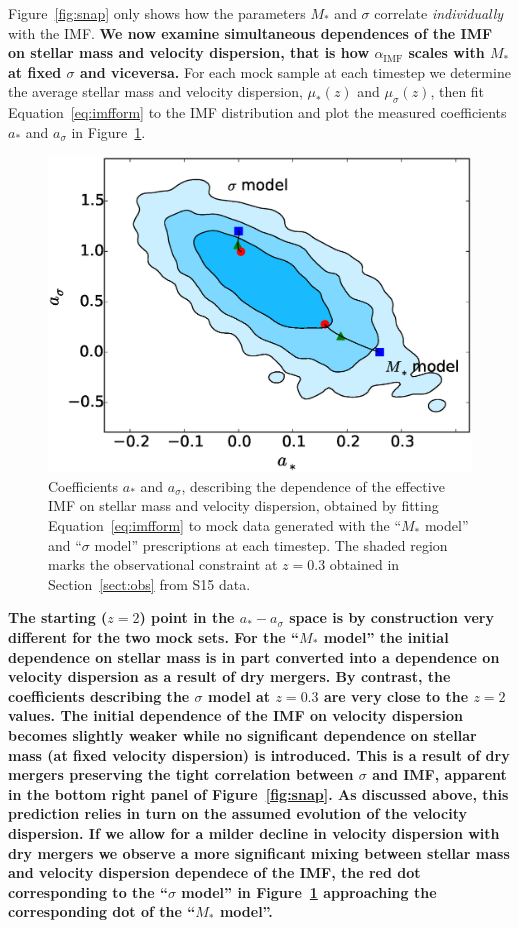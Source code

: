 \documentclass[usenatbib, letters]{mnras}
\def\aimf{\alpha_{\mathrm{IMF}}}
\def\Sref#1{Section~\ref{#1}\xspace}
\def\Fref#1{Figure~\ref{#1}\xspace}
\def\Eref#1{Equation~\ref{#1}\xspace}
\begin{document}
\Fref{fig:snap} only shows how the parameters $M_*$ and $\sigma$ correlate {\em individually} with the IMF.
{\bf We now examine simultaneous dependences of the IMF on stellar mass and velocity dispersion, that is how $\aimf$ scales with $M_*$ at fixed $\sigma$ and viceversa.}
For each mock sample at each timestep we determine the average stellar mass and velocity dispersion, $\mu_*(z)$ and $\mu_\sigma(z)$, then fit \Eref{eq:imfform} to the IMF distribution and plot the measured coefficients $a_*$ and $a_\sigma$ in \Fref{fig:tracks}.
%
\begin{figure}
 \includegraphics[width=\columnwidth]{tracks.eps}
 \caption{ 
Coefficients $a_*$ and $a_\sigma$, describing the dependence of the effective IMF on stellar mass and velocity dispersion, obtained by fitting \Eref{eq:imfform} to mock data generated with the ``$M_*$ model'' and ``$\sigma$ model'' prescriptions at each timestep.
The shaded region marks the observational constraint at $z=0.3$ obtained in \Sref{sect:obs} from S15 data.
}
 \label{fig:tracks}
\end{figure}
%
{\bf
The starting ($z=2$) point in the $a_*-a_\sigma$ space is by construction very different for the two mock sets. 
For the ``$M_*$ model'' the initial dependence on stellar mass is in part converted into a dependence on velocity dispersion as a result of dry mergers.
By contrast, the coefficients describing the $\sigma$ model at $z=0.3$ are very close to the $z=2$ values. The initial dependence of the IMF on velocity dispersion becomes slightly weaker while no significant dependence on stellar mass (at fixed velocity dispersion) is introduced. This is a result of dry mergers preserving the tight correlation between $\sigma$ and IMF, apparent in the bottom right panel of \Fref{fig:snap}.
As discussed above, this prediction relies in turn on the assumed evolution of the velocity dispersion. If we allow for a milder decline in velocity dispersion with dry mergers we observe a more significant mixing between stellar mass and velocity dispersion dependece of the IMF, the red dot corresponding to the ``$\sigma$ model'' in \Fref{fig:tracks} approaching the corresponding dot of the ``$M_*$ model''.
}
 
\end{document}
